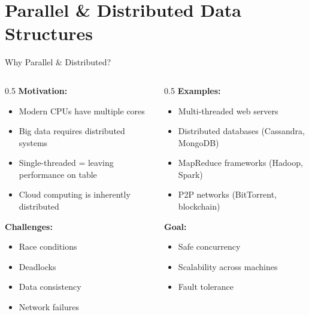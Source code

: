 \documentclass[aspectratio=169,xcolor=dvipsnames]{beamer}
\begin{document}
\section{Parallel \& Distributed Data Structures}

\begin{frame}{Why Parallel \& Distributed?}
  \begin{columns}
    \begin{column}{0.5\textwidth}
      \textbf{Motivation:}
      \begin{itemize}
        \item Modern CPUs have multiple cores
        \item Big data requires distributed systems
        \item Single-threaded = leaving performance on table
        \item Cloud computing is inherently distributed
      \end{itemize}

      \vspace{0.3cm}
      \textbf{Challenges:}
      \begin{itemize}
        \item Race conditions
        \item Deadlocks
        \item Data consistency
        \item Network failures
      \end{itemize}
    \end{column}

    \begin{column}{0.5\textwidth}
      \textbf{Examples:}
      \begin{itemize}
        \item Multi-threaded web servers
        \item Distributed databases (Cassandra, MongoDB)
        \item MapReduce frameworks (Hadoop, Spark)
        \item P2P networks (BitTorrent, blockchain)
      \end{itemize}

      \vspace{0.3cm}
      \textbf{Goal:}
      \begin{itemize}
        \item Safe concurrency
        \item Scalability across machines
        \item Fault tolerance
      \end{itemize}
    \end{column}
  \end{columns}
\end{frame}
\end{document}
